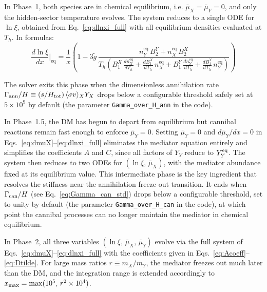 \documentclass[11pt]{article}
\numberwithin{equation}{section}
\newcommand{\TD}{T_h}
\begin{document}
In Phase~1, both species are in chemical equilibrium, i.e. $\bar\mu_X = \bar\mu_Y = 0$, and only the hidden-sector temperature evolves. The system reduces to a single ODE for $\ln\xi$, obtained from Eq.~\eqref{eq:dlnxi_full} with all equilibrium densities evaluated at $T_h$. In formulas:
\begin{equation}
    \frac{d\ln\xi}{dx}\bigg|_{\text{eq}} = \frac{1}{x}\left(1 - 3\tilde{g} \,\frac{n_Y^{\text{eq}}\,B_2^Y + n_X^{\text{eq}}\,B_2^X}{\TD\left(B_1^X\,\frac{dn_X^{\text{eq}}}{d\TD} + \frac{dB_1^X}{d\TD}\,n_X^{\text{eq}} + B_1^Y\,\frac{dn_Y^{\text{eq}}}{d\TD} + \frac{dB_1^Y}{d\TD}\,n_Y^{\text{eq}}\right)}\right)
    \label{eq:dlnxi_eq}
\end{equation}

The solver exits this phase when the dimensionless annihilation rate $\Gamma_{\rm ann}/H \equiv (s/H_{\rm tot})\,\langle\sigma v\rangle_X Y_X$ drops below a configurable threshold safely set at $5\times10^9$ by default (the parameter \texttt{Gamma\_over\_H\_ann} in the code).


In Phase~1.5, the DM has begun to depart from equilibrium but cannibal reactions remain fast enough to enforce $\bar\mu_Y = 0$. Setting $\bar\mu_Y = 0$
and $d\bar\mu_Y/dx = 0$ in Eqs.~\eqref{eq:dmuX}--\eqref{eq:dlnxi_full} eliminates the mediator equation entirely and simplifies the coefficients $A$ and $C$, since all factors of $Y_Y$ reduce to $Y_Y^{\rm eq}$.  The system then reduces to two ODEs for $(\ln\xi,\,\bar\mu_X)$, with the mediator abundance fixed at its equilibrium value. This intermediate phase is the key ingredient that resolves the stiffness near the annihilation freeze-out transition. It ends when $\Gamma_{\rm can}/H$ (see Eq.~\eqref{eq:Gamma_can_std}) drops below a configurable threshold, set to unity by default (the parameter \texttt{Gamma\_over\_H\_can} in the code), at which point the cannibal processes can no longer maintain the mediator in chemical equilibrium.


In Phase~2, all three variables $(\ln\xi,\,\bar\mu_X,\,\bar\mu_Y)$ evolve via the full system of Eqs.~\eqref{eq:dmuX}--\eqref{eq:dlnxi_full} with the coefficients given in Eqs.~\eqref{eq:Acoeff}--\eqref{eq:Dtilde}. For large mass ratios $r\equiv m_X/m_Y$, the mediator freezes out much later than the DM, and the integration range is extended accordingly to $x_{\rm max} = \max(10^5,\,r^2\times10^4)$.
\end{document}
